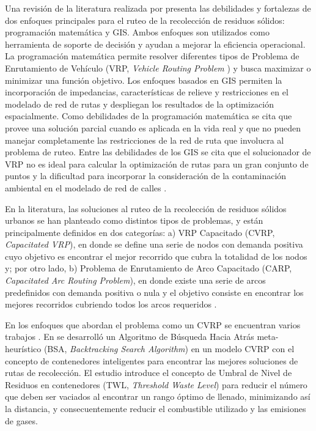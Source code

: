 \documentclass[conference]{IEEEtran}
\begin{document}
Una revisión de la literatura realizada por \cite{Sulemana2018OptimalMethods} presenta las debilidades y fortalezas de dos enfoques principales para el ruteo de la recolección de residuos sólidos: programación matemática y GIS. Ambos enfoques son utilizados como herramienta de soporte de decisión y ayudan a mejorar la eficiencia operacional. La programación matemática permite resolver diferentes tipos de Problema de Enrutamiento de Vehículo (VRP, \textit{Vehicle Routing Problem} \cite{BabaeeTirkolaee2019DevelopingStudy}) y busca maximizar o minimizar una función objetivo. Los enfoques basados en GIS permiten la incorporación de impedancias, características de relieve y restricciones en el modelado de red de rutas y despliegan los resultados de la optimización espacialmente. Como debilidades de la programación matemática se cita que provee una solución parcial cuando es aplicada en la vida real y que no pueden manejar completamente las restricciones de la red de ruta que involucra al problema de ruteo. Entre las debilidades de los GIS se cita que el solucionador de VRP no es ideal para calcular la optimización de rutas para un gran conjunto de puntos y la dificultad para incorporar la consideración de la contaminación ambiental en el modelado de red de calles \cite{Sulemana2018OptimalMethods}.

En la literatura, las soluciones al ruteo de la recolección de residuos sólidos urbanos se han planteado como distintos tipos de problemas, y están principalmente definidos en dos categorías: a) VRP Capacitado (CVRP, \textit{Capacitated VRP}), en donde se define una serie de nodos con demanda positiva cuyo objetivo es encontrar el mejor recorrido que cubra la totalidad de los nodos y; por otro lado, b) Problema de Enrutamiento de Arco Capacitado (CARP, \textit{Capacitated Arc Routing Problem}), en donde existe una serie de arcos predefinidos con demanda positiva o nula y el objetivo consiste en encontrar los mejores recorridos cubriendo todos los arcos requeridos \cite{Tirkolaee2018ATime}.

En los enfoques que abordan el problema como un CVRP se encuentran varios trabajos \cite{Akhtar2017BacktrackingOptimization,Ombuki-Berman2007WASTEALGORITHMS,Kim2006WasteWindows,Billa2014GISOptimization,Karadimas2007OptimalAlgorithm}. En \cite{Akhtar2017BacktrackingOptimization} se desarrolló un Algoritmo de Búsqueda Hacia Atrás meta-heurístico (BSA, \textit{Backtracking Search Algorithm}) en un modelo CVRP con el concepto de contenedores inteligentes para encontrar las mejores soluciones de rutas de recolección. El estudio introduce \cite{Akhtar2017BacktrackingOptimization, AbdullaAlMamun2015IntegratedAutomation} el concepto de Umbral de Nivel de Residuos en contenedores (TWL, \textit{Threshold Waste Level}) para reducir el número que deben ser vaciados al encontrar un rango óptimo de llenado, minimizando así la distancia, y consecuentemente reducir el combustible utilizado y las emisiones de gases.
\end{document}
